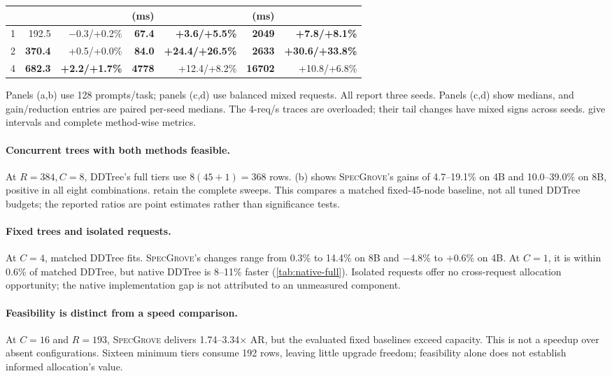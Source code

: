 \documentclass{article}
\newcommand{\method}{\textsc{SpecGrove}\xspace}
\begin{document}
\begin{table}[!t]
\begin{tabular*}{\linewidth}{@{\extracolsep{\fill}}rrrrrrr@{}}
 & & & (ms) & & (ms) & \\
\midrule
1 & 192.5 & $-0.3$/+0.2\% & \textbf{67.4} & \textbf{+3.6/+5.5\%} & \textbf{2049} & \textbf{+7.8/+8.1\%}\\
2 & \textbf{370.4} & +0.5/+0.0\% & \textbf{84.0} & \textbf{+24.4/+26.5\%} & \textbf{2633} & \textbf{+30.6/+33.8\%}\\
4 & \textbf{682.3} & \textbf{+2.2/+1.7\%} & \textbf{4778} & +12.4/+8.2\% & \textbf{16702} & +10.8/+6.8\%\\
\bottomrule
\end{tabular*}
\par\vspace{3pt}
\noindent\parbox{\linewidth}{\footnotesize Panels (a,b) use 128 prompts/task; panels (c,d) use balanced mixed requests. All report three seeds. Panels (c,d) show medians, and gain/reduction entries are paired per-seed medians. The 4-req/s traces are overloaded; their tail changes have mixed signs across seeds.  give intervals and complete method-wise metrics.}
\end{table}


\paragraph{Concurrent trees with both methods feasible.}
At $R=384,C=8$, DDTree's full tiers use $8(45+1)=368$ rows. (b) shows \method's gains of 4.7--19.1\% on 4B and 10.0--39.0\% on 8B, positive in all eight combinations.  retain the complete sweeps. This compares a matched fixed-45-node baseline, not all tuned DDTree budgets; the reported ratios are point estimates rather than significance tests.

\paragraph{Fixed trees and isolated requests.}
At $C=4$, matched DDTree fits. \method's changes range from 0.3\% to 14.4\% on 8B and $-4.8$\% to $+0.6$\% on 4B. At $C=1$, it is within 0.6\% of matched DDTree, but native DDTree is 8--11\% faster (\cref{tab:native-full}). Isolated requests offer no cross-request allocation opportunity; the native implementation gap is not attributed to an unmeasured component.

\paragraph{Feasibility is distinct from a speed comparison.}
At $C=16$ and $R=193$, \method delivers 1.74--3.34$\times$ AR, but the evaluated fixed baselines exceed capacity. This is not a speedup over absent configurations. Sixteen minimum tiers consume 192 rows, leaving little upgrade freedom; feasibility alone does not establish informed allocation's value.
\end{document}
